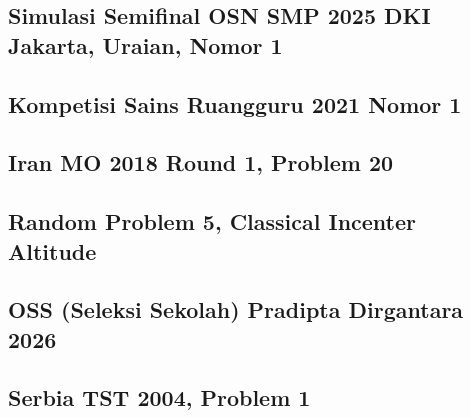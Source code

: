 \subsection{Simulasi Semifinal OSN SMP 2025 DKI Jakarta, Uraian, Nomor 1}


\subsection{Kompetisi Sains Ruangguru 2021 Nomor 1}


\subsection{Iran MO 2018 Round 1, Problem 20}


\subsection{Random Problem 5, Classical Incenter Altitude}


\subsection{OSS (Seleksi Sekolah) Pradipta Dirgantara 2026}


\subsection{Serbia TST 2004, Problem 1}

